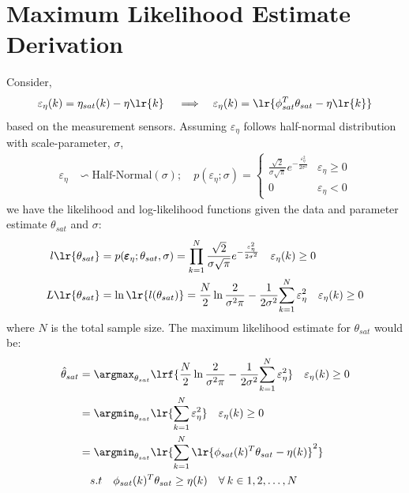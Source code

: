 \section{Maximum Likelihood Estimate Derivation \label{sec::mle_derivation}}
Consider,
\begin{align}
        \varepsilon_\eta(k) &= \eta_{sat}(k) - \eta\lr{k}  \quad
        \implies& \varepsilon_\eta(k) = \lr{\phi_{sat}^T \theta_{sat} - \eta \lr{k}} \label{eqn::eta_regression}
\end{align}
based on the measurement sensors. Assuming $\varepsilon_\eta$ follows half-normal distribution \citep{byers2014half} with scale-parameter, $\sigma$,
\begin{align}
        \varepsilon_\eta &\backsim \text{Half-Normal}(\sigma);\quad
        p(\varepsilon_\eta;\sigma) = \begin{cases} \frac{\sqrt{2}}{\sigma \sqrt{\pi}} e^{- \frac{\varepsilon_\eta^2}{2 \sigma^2}} & \varepsilon_\eta \geq  0\\
                                                        0 & \varepsilon_{\eta} < 0
                                        \end{cases}
                                        \label{eqn::exp_pdf}
\end{align}
we have the likelihood and log-likelihood functions given the data and parameter estimate $\theta_{sat}$ and $\sigma$:
\begin{align}
        l\lr{\theta_{sat}}&=p(\pmb \varepsilon_{\eta};\theta_{sat}, \sigma) = \prod_{k=1}^N  \frac{\sqrt{2}}{\sigma \sqrt{\pi}} e^{- \frac{\varepsilon_\eta^2}{2 \sigma^2}} \quad \varepsilon_\eta(k) \geq  0
        \label{eqn::likelihood}\\
        L\lr{\theta_{sat}}&=\ln \lr{l(\theta_{sat})} = \frac{N}{2} \ln \frac{2}{\sigma^2 \pi} - \frac{1}{2 \sigma^2} {\sum_{k=1}^N \varepsilon_\eta^2}
                \quad \varepsilon_\eta(k) \geq  0
        \label{eqn::log_likelihood}
\end{align}
where $N$ is the total sample size. The maximum likelihood estimate for $\theta_{sat}$ would be:
\begin{align}
        \hat \theta_{sat}
        &= \argmax_{\theta_{sat}} \lrf{ \frac{N}{2} \ln \frac{2}{\sigma^2 \pi} - \frac{1}{2 \sigma^2} {\sum_{k=1}^N \varepsilon_\eta^2} } \quad \varepsilon_\eta(k) \geq  0 \notag\\
        &= \argmin_{\theta_{sat}} \lr{\sum_{k=1}^N \varepsilon_\eta^2} \quad \varepsilon_\eta(k) \geq  0 \notag\\
        &= \argmin_{\theta_{sat}} \lr{\sum_{k=1}^N \lr{\phi_{sat}(k)^T \theta_{sat} - \eta(k)}^2} \notag\\
        &\quad  s.t \quad \phi_{sat}(k)^T \theta_{sat} \geq \eta(k) \quad \forall \: k \in {1,2, \hdots, N}
        \label{eqn::quad_prog}
\end{align}
